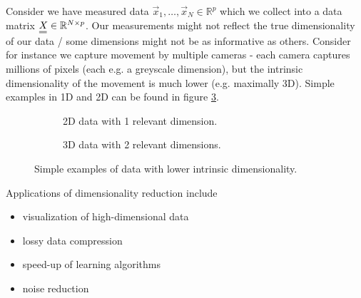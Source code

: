Consider we have measured data $\vec{x}_1, \dots, \vec{x}_N \in \mathbb{R}^p$ which we collect into
a data matrix $\mat{X} \in \mathbb{R}^{N \times p}$. Our measurements might not reflect the true
dimensionality of our data / some dimensions might not be as informative as others. Consider
for instance we capture movement by multiple cameras - each camera captures millions
of pixels (each e.g. a greyscale dimension), but the intrinsic dimensionality of the movement
is much lower (e.g. maximally 3D). Simple examples in 1D and 2D can be found in figure \ref{fig:dimred}.

\begin{figure}

    \centering
    \begin{subfigure}{0.55\textwidth}
      \centering
      
      \caption{2D data with 1 relevant dimension.}
      \label{fig:dimred1}
    \end{subfigure}%

    \begin{subfigure}{0.75\textwidth}
        \centering
        
        \caption{3D data with 2 relevant dimensions.}
        \label{fig:dimred2}
      \end{subfigure}

    \caption{Simple examples of data with lower intrinsic dimensionality.}
    \label{fig:dimred}

\end{figure}


Applications of dimensionality reduction include
\begin{itemize}
    \item visualization of high-dimensional data
    \item lossy data compression
    \item speed-up of learning algorithms
    \item noise reduction
\end{itemize}

